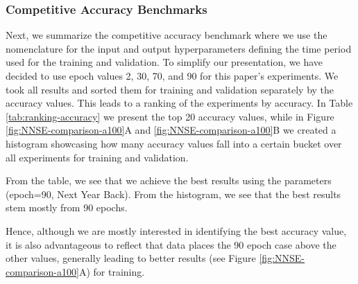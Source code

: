 \subsubsection{Competitive Accuracy Benchmarks}

Next, we summarize the competitive accuracy benchmark where we use the nomenclature for the input and output hyperparameters defining the time period used for the training and validation.  To simplify our presentation, we have decided to use epoch values 2, 30, 70, and 90 for this paper's experiments. We took all results and sorted them for training and validation separately by the accuracy values. This leads to a ranking of the experiments by accuracy. In Table \ref{tab:ranking-accuracy} we present the top 20 accuracy values, while in Figure \ref{fig:NNSE-comparison-a100}A and \ref{fig:NNSE-comparison-a100}B we created a histogram showcasing how many accuracy values fall into a certain bucket over all experiments for training and validation.

From the table, we see that we achieve the best results using the parameters (epoch=90, Next Year Back). From the histogram, we see that the best results stem mostly from 90 epochs.

Hence, although we are mostly interested in identifying the best accuracy value, it is also advantageous to reflect that data places the 90 epoch case above the other values, generally leading to better results (see Figure \ref{fig:NNSE-comparison-a100}A) for training.


